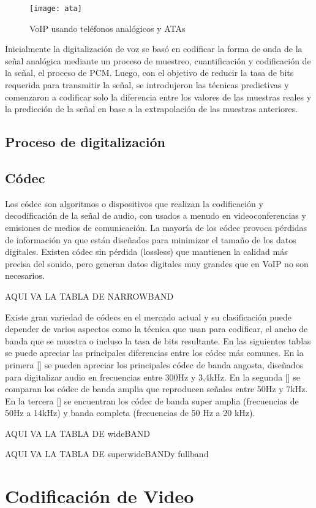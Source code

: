 	
		\begin{figure}[h]
			
			\texttt{[image: ata]}
			
			\caption{VoIP usando teléfonos analógicos y ATAs}
			
			\centering
			
			\label{fig:ata}
		\end{figure}
		
		
Inicialmente la digitalización de voz se basó en codificar la forma de onda de la señal analógica mediante un proceso de muestreo, cuantificación y codificación de la señal, el proceso de PCM. Luego, con el objetivo de reducir la tasa de bits requerida para transmitir la señal, se introdujeron las técnicas predictivas y comenzaron a codificar solo la diferencia entre los valores de las muestras reales y la predicción de la señal en base a la extrapolación de las muestras anteriores.

\subsection{Proceso de digitalización}



\subsection{Códec}

Los códec son algoritmos o dispositivos que realizan la codificación y decodificación de la señal de audio, con usados a menudo en videoconferencias y emisiones de medios de comunicación. La mayoría de los códec provoca pérdidas de información ya que están diseñados para minimizar el tamaño de los datos digitales. Existen códec sin pérdida (lossless) que mantienen la calidad más precisa del sonido, pero generan datos digitales muy grandes que en VoIP no son necesarios.

AQUI VA LA TABLA DE NARROWBAND


Existe gran variedad de códecs en el mercado actual y su clasificación puede depender de varios aspectos como la técnica que usan para codificar, el ancho de banda que se muestra o incluso la tasa de bits resultante. En las siguientes tablas se puede apreciar las principales diferencias entre los códec más comunes. En la primera [] se pueden apreciar los principales códec de banda angosta, diseñados para digitalizar audio en frecuencias entre 300Hz y 3,4kHz. En la segunda [] se comparan los códec de banda amplia que reproducen señales entre 50Hz y 7kHz. En la tercera [] se encuentran los códec de banda super amplia (frecuencias de 50Hz a 14kHz) y banda completa (frecuencias de 50 Hz a 20 kHz).

AQUI VA LA TABLA DE wideBAND

AQUI VA LA TABLA DE superwideBANDy fullband


\section{Codificación de Video}

	